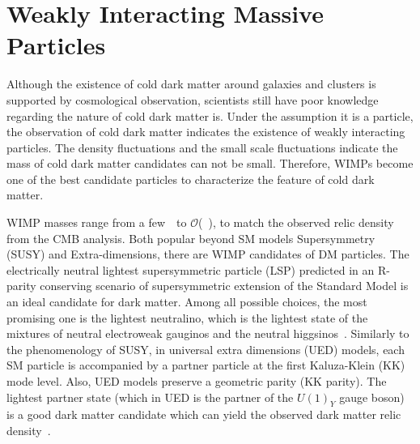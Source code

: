 \section{Weakly Interacting Massive Particles}
\label{sec:dms2}
\par Although the existence of cold dark matter around galaxies and clusters is supported by cosmological observation, scientists still have poor knowledge regarding the nature of cold dark matter is. Under the assumption it is a particle, the observation of cold dark matter indicates the existence of weakly interacting particles. The density fluctuations and the small scale fluctuations indicate the mass of cold dark matter candidates can not be small. Therefore, WIMPs become one of the best candidate particles to characterize the feature of cold dark matter.

\par WIMP masses range from a few~\GeV~to $\mathcal{O}$(~\TeV), to match the observed relic density from the CMB analysis. Both popular beyond SM models Supersymmetry (SUSY) and Extra-dimensions, there are WIMP candidates of DM particles. The electrically neutral lightest supersymmetric particle (LSP) predicted in an R-parity conserving scenario of supersymmetric extension of the Standard Model is an ideal candidate for dark matter. Among all possible choices, the most promising one is the lightest neutralino, which is the lightest state of the mixtures of neutral electroweak gauginos and the neutral higgsinos~\cite{Feng:2010gw}. Similarly to the phenomenology of SUSY, in universal extra dimensions (UED) models, each SM particle is accompanied by a partner particle at the first Kaluza-Klein (KK) mode level. Also, UED models preserve a geometric parity (KK parity). The lightest partner state (which in UED is the partner of the $U(1)_Y$ gauge boson) is a good dark matter candidate which can yield the observed dark matter relic density~\cite{Servant:2002aq}.

